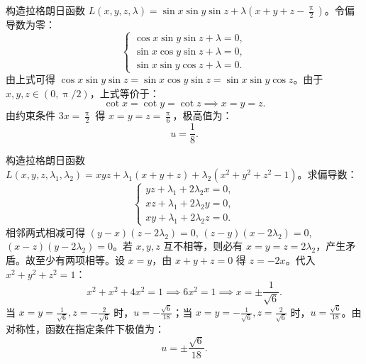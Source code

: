 \begin{solution}
    构造拉格朗日函数 $L(x, y, z, \lambda) = \sin x \sin y \sin z + \lambda \left( x + y + z - \frac{\uppi}{2} \right)$。令偏导数为零：
    \begin{equation}
        \begin{cases}
            \cos x \sin y \sin z + \lambda = 0, \\
            \sin x \cos y \sin z + \lambda = 0, \\
            \sin x \sin y \cos z + \lambda = 0.
        \end{cases}
    \end{equation}
    由上式可得 $\cos x \sin y \sin z = \sin x \cos y \sin z = \sin x \sin y \cos z$。由于 $x, y, z \in (0, \uppi/2)$，上式等价于：
    \begin{equation}
        \cot x = \cot y = \cot z \implies x = y = z.
    \end{equation}
    由约束条件 $3x = \frac{\uppi}{2}$ 得 $x = y = z = \frac{\uppi}{6}$，极高值为：
    \begin{equation}
        \boxed{u = \frac{1}{8}}.
    \end{equation}


    构造拉格朗日函数 $L(x, y, z, \lambda_1, \lambda_2) = x y z + \lambda_{1}(x + y + z) + \lambda_{2}(x^{2} + y^{2} + z^{2} - 1)$。求偏导数：
    \begin{equation}
        \begin{cases}
            y z + \lambda_{1} + 2 \lambda_{2} x = 0, \\
            x z + \lambda_{1} + 2 \lambda_{2} y = 0, \\
            x y + \lambda_{1} + 2 \lambda_{2} z = 0.
        \end{cases}
    \end{equation}
    相邻两式相减可得 $(y - x)(z - 2 \lambda_{2}) = 0$, $(z - y)(x - 2 \lambda_{2}) = 0$, $(x - z)(y - 2 \lambda_{2}) = 0$。若 $x, y, z$ 互不相等，则必有 $x = y = z = 2 \lambda_{2}$，产生矛盾。故至少有两项相等。设 $x = y$，由 $x + y + z = 0$ 得 $z = -2x$。代入 $x^{2} + y^{2} + z^{2} = 1$：
    \begin{equation}
        x^{2} + x^{2} + 4x^{2} = 1 \implies 6x^{2} = 1 \implies x = \pm \frac{1}{\sqrt{6}}.
    \end{equation}
    当 $x = y = \frac{1}{\sqrt{6}}, z = -\frac{2}{\sqrt{6}}$ 时，$u = -\frac{\sqrt{6}}{18}$；当 $x = y = -\frac{1}{\sqrt{6}}, z = \frac{2}{\sqrt{6}}$ 时，$u = \frac{\sqrt{6}}{18}$。由对称性，函数在指定条件下极值为：
    \begin{equation}
        \boxed{u = \pm \frac{\sqrt{6}}{18}}.
    \end{equation}
\end{solution}


